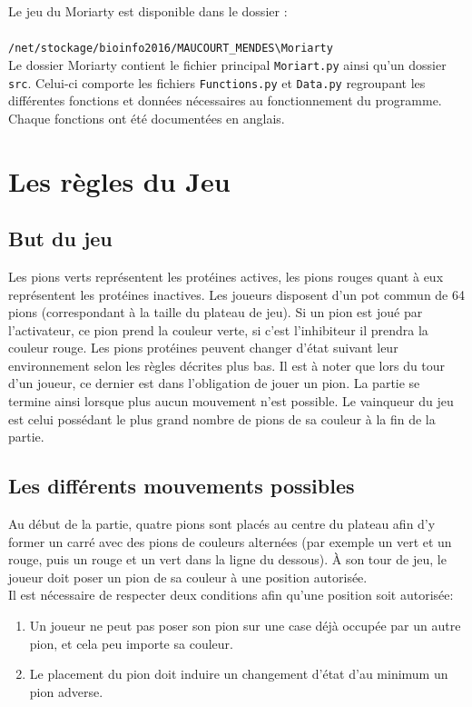 Le jeu du Moriarty est disponible dans le dossier :\\ \\
\verb|/net/stockage/bioinfo2016/MAUCOURT_MENDES\Moriarty|\\
Le dossier Moriarty contient le fichier principal \verb|Moriart.py| ainsi qu'un dossier \verb|src|. Celui-ci comporte les fichiers \verb|Functions.py| et \verb|Data.py| regroupant les différentes fonctions et données nécessaires au fonctionnement du programme. Chaque fonctions ont été documentées en anglais.
\newpage
\section{Les règles du Jeu}

\subsection{But du jeu}

Les pions verts représentent les protéines actives, les pions rouges quant à eux représentent les protéines inactives. Les joueurs disposent d'un pot commun de 64 pions (correspondant à la taille du plateau de jeu). Si un pion est joué par l’activateur, ce pion prend la couleur verte, si c’est l’inhibiteur il prendra la couleur rouge. Les pions protéines peuvent changer d’état suivant leur environnement selon les règles décrites plus bas. Il est à noter que lors du tour d'un joueur, ce dernier est dans l'obligation de jouer un pion. La partie se termine  ainsi lorsque plus aucun mouvement n'est possible. Le vainqueur du jeu est celui possédant le plus grand nombre de pions de sa couleur à la fin de la partie.


\subsection{Les différents mouvements possibles}

Au début de la partie, quatre pions sont placés au centre du plateau afin d'y former un carré avec des pions de couleurs alternées (par exemple un vert et un rouge, puis un rouge et un vert dans la ligne du dessous).
À son tour de jeu, le joueur doit poser un pion de sa couleur à une position autorisée.
\\Il est nécessaire de respecter deux conditions afin qu'une position soit autorisée:
\begin{enumerate}
\item Un joueur ne peut pas poser son pion sur une case déjà occupée par un autre pion, et cela peu importe sa couleur.
\item Le placement du pion doit induire un changement d'état d'au minimum un pion adverse.

\end{enumerate}

